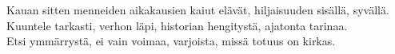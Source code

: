 \documentclass{article}
\begin{document}
\begin{infobox}
Kauan sitten menneiden aikakausien kaiut elävät, hiljaisuuden sisällä, syvällä.\\
Kuuntele tarkasti, verhon läpi, historian hengitystä, ajatonta tarinaa.\\
Etsi ymmärrystä, ei vain voimaa, varjoista, missä totuus on kirkas.
\end{infobox}
\end{document}
